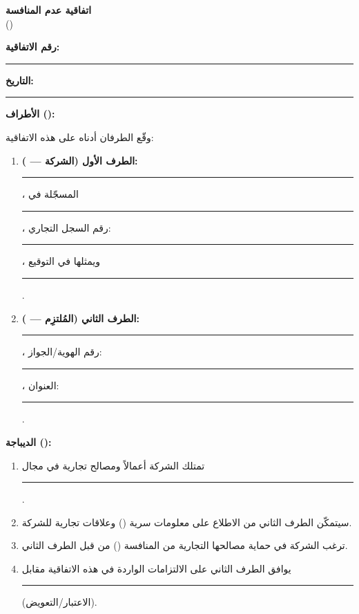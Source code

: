 \documentclass[12pt,a4paper]{article}
\begin{document}
\begin{center}
{\LARGE\bfseries اتفاقية عدم المنافسة}\\[0.5em]
{\large ()}\\[1em]
\end{center}

\vspace{0.5em}

\noindent\textbf{رقم الاتفاقية:} \rule{4cm}{0.4pt} \hfill \textbf{التاريخ:} \rule{4cm}{0.4pt}

\vspace{1em}

\noindent\textbf{الأطراف ():}

\noindent وقّع الطرفان أدناه على هذه الاتفاقية:

\begin{enumerate}
    \item \textbf{الطرف الأول (الشركة — ):} \rule{6cm}{0.4pt}، المسجّلة في \rule{4cm}{0.4pt}، رقم السجل التجاري: \rule{3cm}{0.4pt}، ويمثلها في التوقيع \rule{5cm}{0.4pt}.

    \item \textbf{الطرف الثاني (المُلتزِم — ):} \rule{6cm}{0.4pt}، رقم الهوية/الجواز: \rule{3cm}{0.4pt}، العنوان: \rule{5cm}{0.4pt}.
\end{enumerate}

\vspace{1em}

\noindent\textbf{الديباجة ():}

\begin{enumerate}
    \item تمتلك الشركة أعمالاً ومصالح تجارية في مجال \rule{6cm}{0.4pt}.
    \item سيتمكّن الطرف الثاني من الاطلاع على معلومات سرية () وعلاقات تجارية للشركة.
    \item ترغب الشركة في حماية مصالحها التجارية من المنافسة () من قبل الطرف الثاني.
    \item يوافق الطرف الثاني على الالتزامات الواردة في هذه الاتفاقية مقابل \rule{4cm}{0.4pt} (الاعتبار/التعويض).
\end{enumerate}
\end{document}
